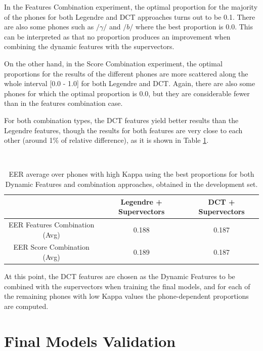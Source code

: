 In the Features Combination experiment,
the optimal proportion for the majority of the phones
for both Legendre and DCT approaches turns out to be 0.1.
There are also some phones such as
$/\gamma/$ and $/b/$ where the best proportion is 0.0.
This can be interpreted as that
no proportion produces an improvement when combining the dynamic features with the supervectors.

On the other hand, in the Score Combination experiment, the optimal proportions for
the results of the different phones are more scattered along the whole interval [0.0 - 1.0]
for both Legendre and
DCT. Again, there are also some phones for which the optimal proportion is 0.0, but they are
considerable fewer than in the features combination case.

For both combination types, the DCT features yield better results than the Legendre features,
though the results for both features are very close to each other (around 1\% of relative
difference), as it is shown in Table \ref{table:legendreVsDCTCombinations}.

~

\begin{table}[h]
	\renewcommand{\arraystretch}{1.5}
	\begin{center}
	    \begin{tabular}{ | c | c | c | }
	    \hline
	    & Legendre + Supervectors & DCT + Supervectors \\ \hline
	    EER Features Combination (Avg) & 0.188 & 0.187 \\ \hline
	    EER Score Combination (Avg) & 0.189  & 0.187 \\ \hline
	    \end{tabular}
	    \caption{EER average over phones with high Kappa using the best proportions for
	    both Dynamic Features and combination approaches, obtained in the development set.}
	    \label{table:legendreVsDCTCombinations}
	\end{center}
\end{table}

At this point, the DCT features are chosen as the Dynamic Features to be combined with the
supervectors when training the final models, and for each of the remaining phones with
low Kappa values the phone-dependent proportions are computed.

\section{Final Models Validation} \label{subsection:modelValidation}

